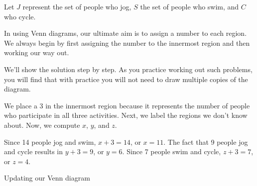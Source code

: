 \begin{solution}
    Let \( J \) represent the set of people who jog, \( S \) the set of people who swim, and \( C \) who cycle.

    In using Venn diagrams, our ultimate aim is to assign a number to each region. We always begin by first assigning the number to the innermost region and then working our way out.

    We’ll show the solution step by step. As you practice working out such problems, you will find that with practice you will not need to draw multiple copies of the diagram.


    \begin{center}
        \begin{venndiagram3sets}[
                labelA=\(J\),
                labelB=\(S\),
                labelC=\(C\),
                labelABC={3},
                labelOnlyAB={x},
                labelOnlyBC={z},
                labelOnlyAC={y},
                labelOnlyA={a},
                labelOnlyB={b},
                labelOnlyC={c},
            ]
        \end{venndiagram3sets}
    \end{center}

    We place a 3 in the innermost region because it represents the number of people who participate in all three activities. Next, we label the regions we don't know about. Now, we compute \( x \), \( y \), and \( z \).

    Since 14 people jog and swim, \( x + 3 = 14 \), or \( x = 11 \).
    The fact that 9 people jog and cycle results in \( y + 3 = 9 \), or \( y = 6 \).
    Since 7 people swim and cycle, \( z + 3 = 7 \), or \( z = 4 \).

    Updating our Venn diagram

    \begin{center}
        \begin{venndiagram3sets}[
                labelA=\(J\),
                labelB=\(S\),
                labelC=\(C\),
                labelABC={3},
                labelOnlyAB={11},
                labelOnlyBC={4},
                labelOnlyAC={6},
                labelOnlyA={a},
                labelOnlyB={b},
                labelOnlyC={c},
            ]
        \end{venndiagram3sets}
    \end{center}


\end{solution}
